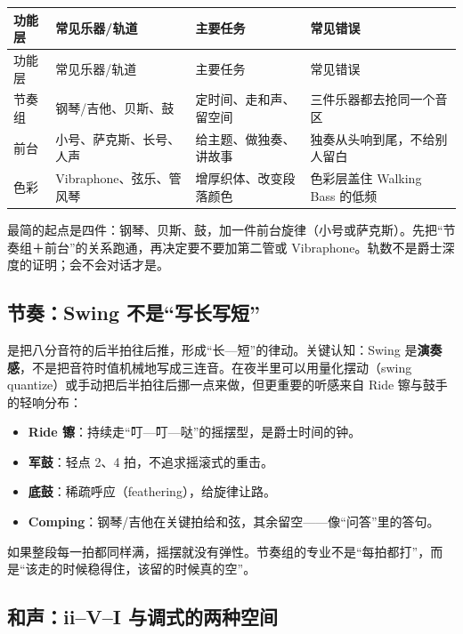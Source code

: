 \begin{longtable}{p{}p{}p{}p{}}
\toprule
功能层 & 常见乐器/轨道 & 主要任务 & 常见错误 \\
\midrule
\endfirsthead
\toprule
功能层 & 常见乐器/轨道 & 主要任务 & 常见错误 \\
\midrule
\endhead
节奏组 & 钢琴/吉他、贝斯、鼓 & 定时间、走和声、留空间 & 三件乐器都去抢同一个音区 \\
前台 & 小号、萨克斯、长号、人声 & 给主题、做独奏、讲故事 & 独奏从头响到尾，不给别人留白 \\
色彩 & Vibraphone、弦乐、管风琴 & 增厚织体、改变段落颜色 & 色彩层盖住 Walking Bass 的低频 \\
\bottomrule
\end{longtable}

最简的起点是四件：钢琴、贝斯、鼓，加一件前台旋律（小号或萨克斯）。先把“节奏组＋前台”的关系跑通，再决定要不要加第二管或 Vibraphone。轨数不是爵士深度的证明；会不会对话才是。

\subsection{节奏：Swing 不是“写长写短”}
\label{sec:jazz-groove}

是把八分音符的后半拍往后推，形成“长—短”的律动。关键认知：Swing 是\textbf{演奏感}，不是把音符时值机械地写成三连音。在夜半里可以用量化摆动（swing quantize）或手动把后半拍往后挪一点来做，但更重要的听感来自 Ride 镲与鼓手的轻响分布：

\begin{itemize}
\item \textbf{Ride 镲}：持续走“叮—叮—哒”的摇摆型，是爵士时间的钟。
\item \textbf{军鼓}：轻点 2、4 拍，不追求摇滚式的重击。
\item \textbf{底鼓}：稀疏呼应（feathering），给旋律让路。
\item \textbf{Comping}：钢琴/吉他在关键拍给和弦，其余留空——像“问答”里的答句。
\end{itemize}

如果整段每一拍都同样满，摇摆就没有弹性。节奏组的专业不是“每拍都打”，而是“该走的时候稳得住，该留的时候真的空”。

\subsection{和声：ii–V–I 与调式的两种空间}
\label{sec:jazz-harmony}

